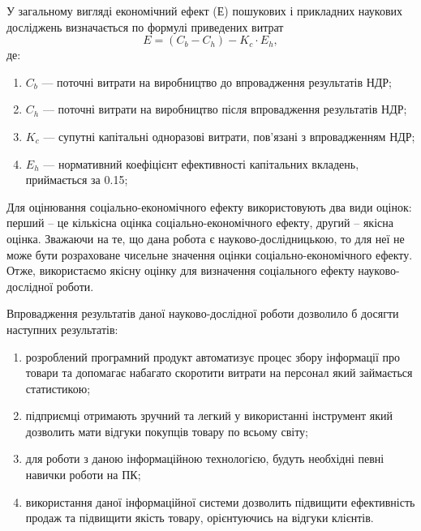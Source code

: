 У загальному вигляді економічний ефект ($Е$) пошукових і прикладних наукових досліджень визначається по формулі приведених витрат
\begin{equation}
E = (C_b - C_h) - K_c   \cdot   E_h, \nonumber
\end{equation}
де:
\begin{enumerate}
\item $C_b$ --- поточні витрати на виробництво до впровадження результатів НДР;
\item $C_h$ --- поточні витрати на виробництво після впровадження результатів НДР;
\item $K_c$ --- супутні капітальні одноразові витрати, пов'язані з впровадженням НДР;
\item $E_h$ --- нормативний коефіцієнт ефективності капітальних вкладень, приймається за 0.15;
\end{enumerate}

Для оцінювання соціально-економічного ефекту використовують два види оцінок: перший – це кількісна оцінка соціально-економічного ефекту, другий – якісна оцінка. Зважаючи на те, що дана робота є науково-дослідницькою, то для неї не може бути розраховане чисельне значення оцінки соціально-економічного ефекту. Отже, використаємо якісну оцінку для визначення соціального ефекту науково-дослідної роботи.

Впровадження результатів даної науково-дослідної роботи дозволило б досягти наступних результатів:
\begin{enumerate}
\item розроблений програмний продукт автоматизує процес збору інформації про товари та допомагає набагато скоротити витрати на персонал який займається статистикою;
\item підприємці отримають зручний та легкий у використанні інструмент який дозволить мати відгуки покупців товару по всьому світу;
\item для роботи з даною інформаційною технологією, будуть необхідні певні навички роботи на ПК;
\item використання даної інформаційної системи дозволить підвищити ефективність продаж та підвищити якість товару, орієнтуючись на відгуки клієнтів.
\end{enumerate}
